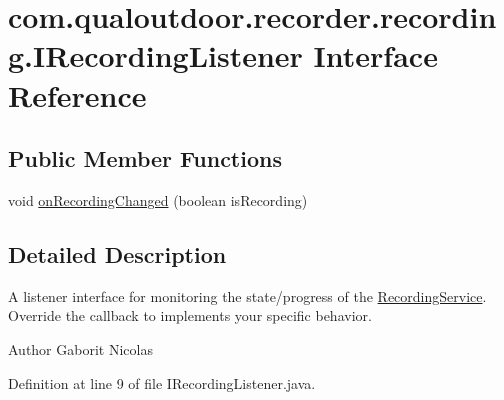 \hypertarget{interfacecom_1_1qualoutdoor_1_1recorder_1_1recording_1_1IRecordingListener}{\section{com.\-qualoutdoor.\-recorder.\-recording.\-I\-Recording\-Listener Interface Reference}
\label{interfacecom_1_1qualoutdoor_1_1recorder_1_1recording_1_1IRecordingListener}
}
\subsection*{Public Member Functions}
\begin{DoxyCompactItemize}
\item 
void \hyperlink{interfacecom_1_1qualoutdoor_1_1recorder_1_1recording_1_1IRecordingListener_a83822f6d693c3e22c74db48341a6c36c}{on\-Recording\-Changed} (boolean is\-Recording)
\end{DoxyCompactItemize}


\subsection{Detailed Description}
A listener interface for monitoring the state/progress of the \hyperlink{classcom_1_1qualoutdoor_1_1recorder_1_1recording_1_1RecordingService}{Recording\-Service}. Override the callback to implements your specific behavior.

\begin{DoxyAuthor}{Author}
Gaborit Nicolas 
\end{DoxyAuthor}


Definition at line 9 of file I\-Recording\-Listener.\-java.



